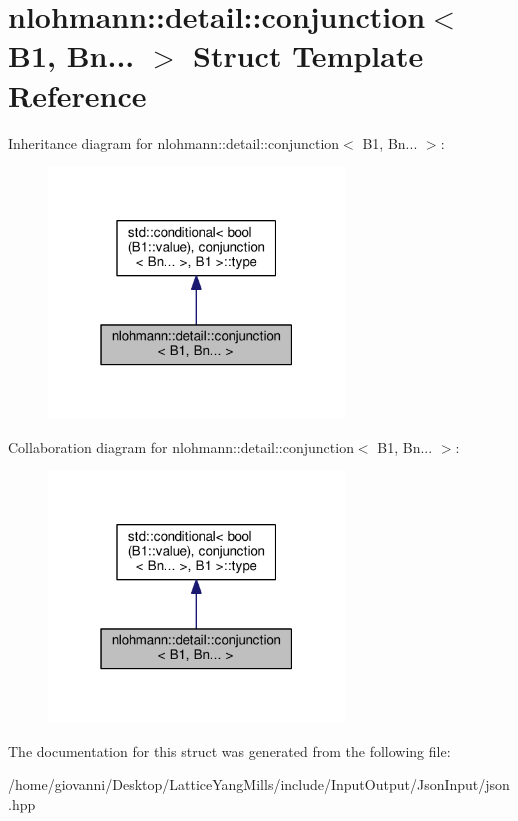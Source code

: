 \hypertarget{structnlohmann_1_1detail_1_1conjunction_3_01B1_00_01Bn_8_8_8_01_4}{}\section{nlohmann\+:\+:detail\+:\+:conjunction$<$ B1, Bn... $>$ Struct Template Reference}
\label{structnlohmann_1_1detail_1_1conjunction_3_01B1_00_01Bn_8_8_8_01_4}


Inheritance diagram for nlohmann\+:\+:detail\+:\+:conjunction$<$ B1, Bn... $>$\+:\nopagebreak
\begin{figure}[H]
\begin{center}
\leavevmode
\includegraphics[width=223pt]{structnlohmann_1_1detail_1_1conjunction_3_01B1_00_01Bn_8_8_8_01_4__inherit__graph}
\end{center}
\end{figure}


Collaboration diagram for nlohmann\+:\+:detail\+:\+:conjunction$<$ B1, Bn... $>$\+:\nopagebreak
\begin{figure}[H]
\begin{center}
\leavevmode
\includegraphics[width=223pt]{structnlohmann_1_1detail_1_1conjunction_3_01B1_00_01Bn_8_8_8_01_4__coll__graph}
\end{center}
\end{figure}


The documentation for this struct was generated from the following file\+:\begin{DoxyCompactItemize}
\item 
/home/giovanni/\+Desktop/\+Lattice\+Yang\+Mills/include/\+Input\+Output/\+Json\+Input/json.\+hpp\end{DoxyCompactItemize}
